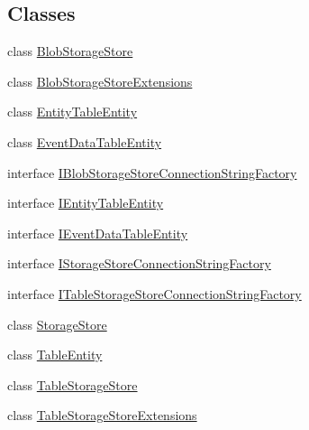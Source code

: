 \subsection*{Classes}
\begin{DoxyCompactItemize}
\item 
class \hyperlink{classCqrs_1_1Azure_1_1BlobStorage_1_1BlobStorageStore}{Blob\+Storage\+Store}
\item 
class \hyperlink{classCqrs_1_1Azure_1_1BlobStorage_1_1BlobStorageStoreExtensions}{Blob\+Storage\+Store\+Extensions}
\item 
class \hyperlink{classCqrs_1_1Azure_1_1BlobStorage_1_1EntityTableEntity}{Entity\+Table\+Entity}
\item 
class \hyperlink{classCqrs_1_1Azure_1_1BlobStorage_1_1EventDataTableEntity}{Event\+Data\+Table\+Entity}
\item 
interface \hyperlink{interfaceCqrs_1_1Azure_1_1BlobStorage_1_1IBlobStorageStoreConnectionStringFactory}{I\+Blob\+Storage\+Store\+Connection\+String\+Factory}
\item 
interface \hyperlink{interfaceCqrs_1_1Azure_1_1BlobStorage_1_1IEntityTableEntity}{I\+Entity\+Table\+Entity}
\item 
interface \hyperlink{interfaceCqrs_1_1Azure_1_1BlobStorage_1_1IEventDataTableEntity}{I\+Event\+Data\+Table\+Entity}
\item 
interface \hyperlink{interfaceCqrs_1_1Azure_1_1BlobStorage_1_1IStorageStoreConnectionStringFactory}{I\+Storage\+Store\+Connection\+String\+Factory}
\item 
interface \hyperlink{interfaceCqrs_1_1Azure_1_1BlobStorage_1_1ITableStorageStoreConnectionStringFactory}{I\+Table\+Storage\+Store\+Connection\+String\+Factory}
\item 
class \hyperlink{classCqrs_1_1Azure_1_1BlobStorage_1_1StorageStore}{Storage\+Store}
\item 
class \hyperlink{classCqrs_1_1Azure_1_1BlobStorage_1_1TableEntity}{Table\+Entity}
\item 
class \hyperlink{classCqrs_1_1Azure_1_1BlobStorage_1_1TableStorageStore}{Table\+Storage\+Store}
\item 
class \hyperlink{classCqrs_1_1Azure_1_1BlobStorage_1_1TableStorageStoreExtensions}{Table\+Storage\+Store\+Extensions}
\end{DoxyCompactItemize}
